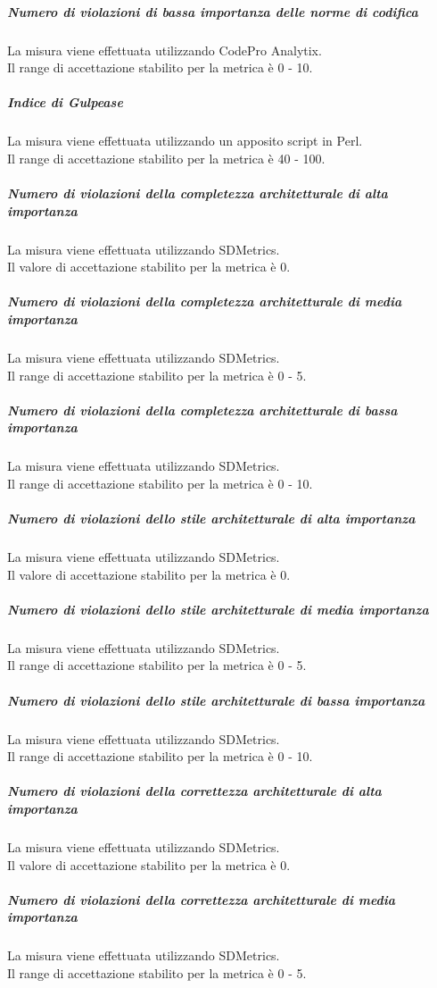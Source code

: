 			\subparagraph{Numero di violazioni di bassa importanza delle norme di codifica}
			La misura viene effettuata utilizzando CodePro Analytix.
			\\Il range di accettazione stabilito per la metrica è 0 - 10.
			
			\subparagraph{Indice di Gulpease}
			La misura viene effettuata utilizzando un apposito script in Perl.
			\\Il range di accettazione stabilito per la metrica è 40 - 100.
			
			\subparagraph{Numero di violazioni della completezza architetturale di alta importanza}
			La misura viene effettuata utilizzando SDMetrics.
			\\Il valore di accettazione stabilito per la metrica è 0.
			
			\subparagraph{Numero di violazioni della completezza architetturale di media importanza}
			La misura viene effettuata utilizzando SDMetrics.
			\\Il range di accettazione stabilito per la metrica è 0 - 5.
			
			\subparagraph{Numero di violazioni della completezza architetturale di bassa importanza}
			La misura viene effettuata utilizzando SDMetrics.
			\\Il range di accettazione stabilito per la metrica è 0 - 10.
			
			\subparagraph{Numero di violazioni dello stile architetturale di alta importanza}
			La misura viene effettuata utilizzando SDMetrics.
			\\Il valore di accettazione stabilito per la metrica è 0.
			
			\subparagraph{Numero di violazioni dello stile architetturale di media importanza}
			La misura viene effettuata utilizzando SDMetrics.
			\\Il range di accettazione stabilito per la metrica è 0 - 5.
			
			\subparagraph{Numero di violazioni dello stile architetturale di bassa importanza}
			La misura viene effettuata utilizzando SDMetrics.
			\\Il range di accettazione stabilito per la metrica è 0 - 10.
			
			\subparagraph{Numero di violazioni della correttezza architetturale di alta importanza}
			La misura viene effettuata utilizzando SDMetrics.
			\\Il valore di accettazione stabilito per la metrica è 0.
			
			\subparagraph{Numero di violazioni della correttezza architetturale di media importanza}
			La misura viene effettuata utilizzando SDMetrics.
			\\Il range di accettazione stabilito per la metrica è 0 - 5.
			
